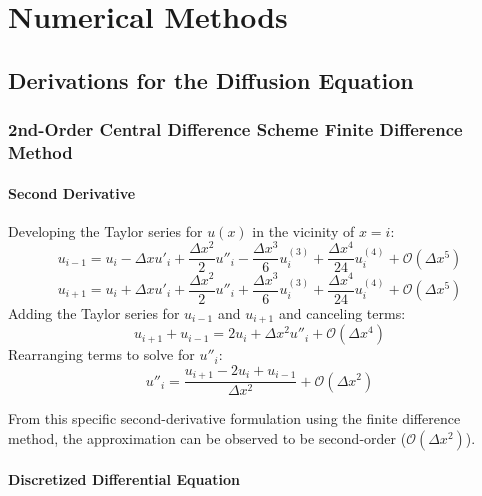 \documentclass[10pt]{article}		%
\numberwithin{equation}{section}
\begin{document}
\newpage

\section{Numerical Methods}

\subsection{Derivations for the Diffusion Equation}

\subsubsection{2nd-Order Central Difference Scheme Finite Difference Method}

\paragraph{Second Derivative}

Developing the Taylor series for $u(x)$ in the vicinity of $x = i$:
\begin{equation}
u_{i-1} = u_i - \Delta x u'_i + \frac{\Delta x^2}{2} u''_i - \frac{\Delta x^3}{6} u^{(3)}_i + \frac{\Delta x^4}{24} u^{(4)}_i + \mathcal{O}(\Delta x^5)
\end{equation}
\begin{equation}
u_{i+1} = u_i + \Delta x u'_i + \frac{\Delta x^2}{2} u''_i + \frac{\Delta x^3}{6} u^{(3)}_i + \frac{\Delta x^4}{24} u^{(4)}_i + \mathcal{O}(\Delta x^5)
\end{equation}
Adding the Taylor series for $u_{i-1}$ and $u_{i+1}$ and canceling terms:
\begin{equation}
u_{i+1} + u_{i-1} = 2u_i + \Delta x^2 u''_i + \mathcal{O}(\Delta x^4)
\end{equation}
Rearranging terms to solve for $u''_i$:
\begin{equation}
u''_i = \frac{u_{i+1} - 2u_i + u_{i-1}}{\Delta x^2} + \mathcal{O}(\Delta x^2) 
\end{equation}

From this specific second-derivative formulation using the finite difference method, the approximation can be observed to be second-order ($\mathcal{O}(\Delta x^2)$).

\paragraph{Discretized Differential Equation}
\end{document}
